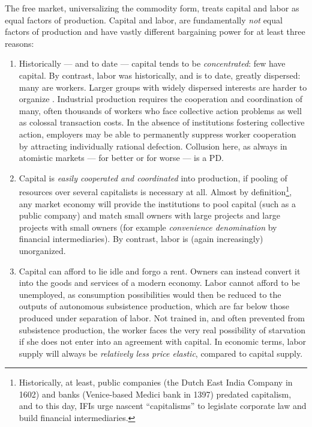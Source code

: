 The free market, universalizing the commodity form, treats capital and labor as equal factors of production. Capital and labor, are fundamentally \emph{not} equal factors of production and have vastly different bargaining power for at least three reasons:

\begin{enumerate}
	\item Historically --- and to date --- capital tends to be \emph{concentrated}: few have capital. By contrast, labor was historically, and is to date, greatly dispersed: many are workers. Larger groups with widely dispersed interests are harder to organize \citep{Olson-1971-aa}. Industrial production requires the cooperation and coordination of many, often thousands of workers who face collective action problems as well as colossal transaction costs. In the absence of institutions fostering collective action, employers may be able to permanently suppress worker cooperation by attracting individually rational defection. Collusion here, as always in atomistic markets --- for better or for worse --- is a \gls{PD}.
	\item Capital is \emph{easily cooperated and coordinated} into production, if pooling of resources over several capitalists is necessary at all. Almost by definition\footnote{
		Historically, at least, public companies (the Dutch East India Company in 1602) and banks (Venice-based Medici bank in 1397) predated capitalism, and to this day, \glspl{IFI} urge nascent ``capitalisms'' to legislate corporate law and build financial intermediaries.}, %
	any market economy will provide the institutions to pool capital (such as a public company) and match small owners with large projects and large projects with small owners (for example  \emph{convenience denomination} by financial intermediaries). By contrast, labor is (again increasingly) unorganized.
	\item Capital can afford to lie idle and forgo a rent. Owners can instead convert it into the goods and services of a modern economy. Labor cannot afford to be unemployed, as consumption possibilities would then be reduced to the outputs of autonomous subsistence production, which are far below those produced under separation of labor. Not trained in, and often prevented from subsistence production, the worker faces the very real possibility of starvation if she does not enter into an agreement with capital. In economic terms, labor supply will always be \emph{relatively less price elastic}, compared to capital supply. 
\end{enumerate}

